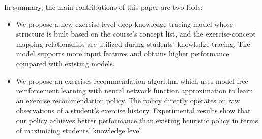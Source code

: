 \documentclass{edm_template}
\begin{document}
In summary, 
the main contributions of this paper are two folds:
\begin{itemize}
\item
We propose a new exercise-level deep knowledge tracing model whose structure is built based on the course's concept list, and the exercise-concept mapping relationships are utilized during students' knowledge tracing. The model supports more input features and obtains higher performance compared with existing models.
\item
We propose an exercises recommendation algorithm which uses model-free reinforcement learning with neural network function approximation to learn an exercise recommendation policy. The policy directly operates on raw observations of a student's exercise history. Experimental results show that our policy achieves better performance than existing heuristic policy in terms of maximizing students' knowledge level.



\end{itemize}
\end{document}
